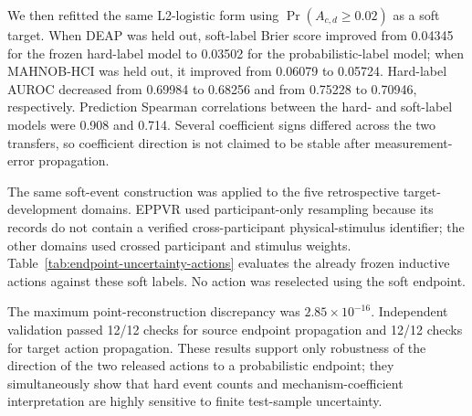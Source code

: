 \documentclass[preprint,12pt]{elsarticle}
\begin{document}
We then refitted the same L2-logistic form using $\Pr(A_{c,d}\geq0.02)$ as a soft target. When DEAP was held out, soft-label Brier score improved from 0.04345 for the frozen hard-label model to 0.03502 for the probabilistic-label model; when MAHNOB-HCI was held out, it improved from 0.06079 to 0.05724. Hard-label AUROC decreased from 0.69984 to 0.68256 and from 0.75228 to 0.70946, respectively. Prediction Spearman correlations between the hard- and soft-label models were 0.908 and 0.714. Several coefficient signs differed across the two transfers, so coefficient direction is not claimed to be stable after measurement-error propagation.

The same soft-event construction was applied to the five retrospective target-development domains. EPPVR used participant-only resampling because its records do not contain a verified cross-participant physical-stimulus identifier; the other domains used crossed participant and stimulus weights. Table~\ref{tab:endpoint-uncertainty-actions} evaluates the already frozen inductive actions against these soft labels. No action was reselected using the soft endpoint.

\begin{table}[!htbp]
\centering
\caption{Post-hoc soft-endpoint evaluation of frozen inductive actions. Positive gain favors the released action; zero denotes a return-original action and is not evidence of calibration effectiveness.}
\label{tab:endpoint-uncertainty-actions}
\small
{}
\end{table}

The maximum point-reconstruction discrepancy was $2.85\times10^{-16}$. Independent validation passed 12/12 checks for source endpoint propagation and 12/12 checks for target action propagation. These results support only robustness of the direction of the two released actions to a probabilistic endpoint; they simultaneously show that hard event counts and mechanism-coefficient interpretation are highly sensitive to finite test-sample uncertainty.
\end{document}
